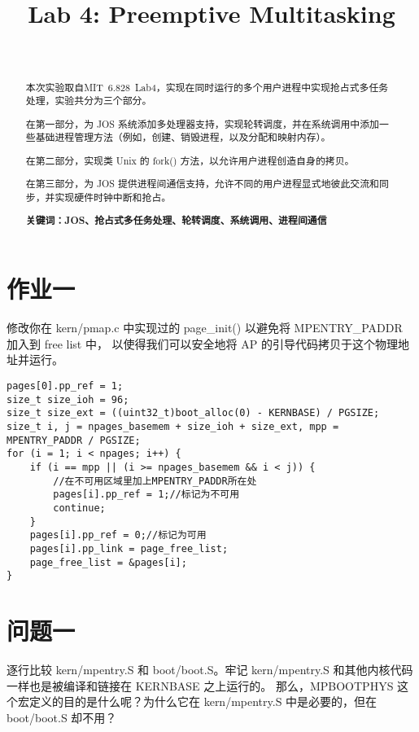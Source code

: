 \documentclass[12pt,a4paper]{article}
\begin{document}
\title{Lab 4:  Preemptive Multitasking}
\author{\ }

\maketitle

\begin{abstract}
    \setlength{\parindent}{2em}
    本次实验取自MIT\ 6.828\ Lab4，实现在同时运行的多个用户进程中实现抢占式多任务处理，实验共分为三个部分。

    在第一部分，为 JOS 系统添加多处理器支持，实现轮转调度，并在系统调用中添加一些基础进程管理方法（例如，创建、销毁进程，以及分配和映射内存）。
    
    在第二部分，实现类 Unix 的 fork() 方法，以允许用户进程创造自身的拷贝。
    
    在第三部分，为 JOS 提供进程间通信支持，允许不同的用户进程显式地彼此交流和同步，并实现硬件时钟中断和抢占。

    \textbf{关键词：JOS、抢占式多任务处理、轮转调度、系统调用、进程间通信}
\end{abstract}

\section{作业一}

修改你在 kern/pmap.c 中实现过的 page\_init() 以避免将 MPENTRY\_PADDR 加入到 free list 中，
以使得我们可以安全地将 AP 的引导代码拷贝于这个物理地址并运行。

\begin{lstlisting}[style=CPP]
pages[0].pp_ref = 1;
size_t size_ioh = 96;
size_t size_ext = ((uint32_t)boot_alloc(0) - KERNBASE) / PGSIZE;
size_t i, j = npages_basemem + size_ioh + size_ext, mpp = MPENTRY_PADDR / PGSIZE;
for (i = 1; i < npages; i++) {
    if (i == mpp || (i >= npages_basemem && i < j)) {
        //在不可用区域里加上MPENTRY_PADDR所在处
        pages[i].pp_ref = 1;//标记为不可用
        continue;
    }
    pages[i].pp_ref = 0;//标记为可用
    pages[i].pp_link = page_free_list;
    page_free_list = &pages[i];
}
\end{lstlisting}

\section{问题一}

逐行比较 kern/mpentry.S 和 boot/boot.S。牢记 kern/mpentry.S 和其他内核代码一样也是被编译和链接在 KERNBASE 之上运行的。
那么，MPBOOTPHYS 这个宏定义的目的是什么呢？为什么它在 kern/mpentry.S 中是必要的，但在 boot/boot.S 却不用？
\end{document}
